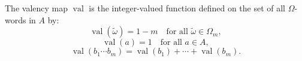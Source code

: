 The valency map $\operatorname{val}$ is the integer-valued function defined on the set of all $\Omega$-words in $A$ by:
$$\operatorname{val}(\tilde{\omega}) = 1 - m \quad \text{for all } \tilde{\omega} \in \Omega_m,$$
$$\operatorname{val}(a) = 1 \quad \text{for all } a \in A,$$
$$\operatorname{val}(b_1 \cdots b_m) = \operatorname{val}(b_1) + \cdots + \operatorname{val}(b_m).$$
